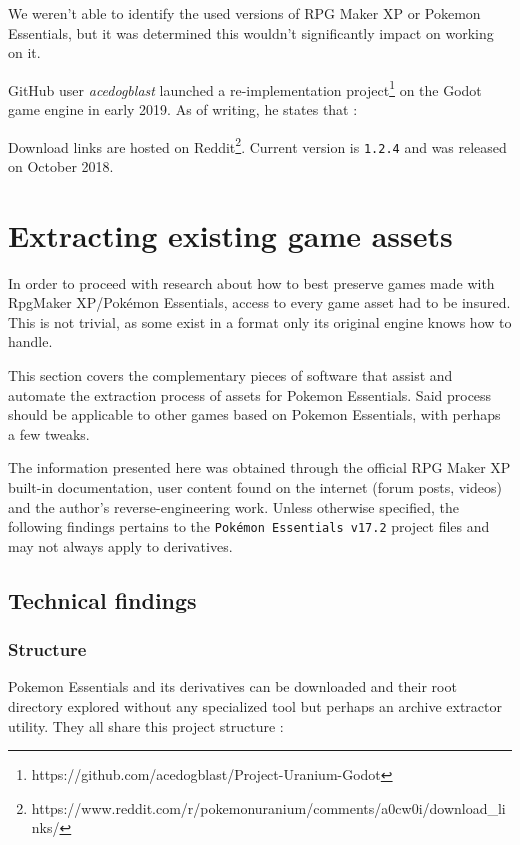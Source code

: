 \documentclass[11pt]{article}
\begin{document}
{We weren't able to identify the used versions of RPG Maker XP or Pokemon Essentials, but it was determined this wouldn't significantly impact on working on it.
	
GitHub user \textit{acedogblast} launched a re-implementation project\footnote{https://github.com/acedogblast/Project-Uranium-Godot} on the Godot game engine in early 2019. As of writing, he states that :
	
Download links are hosted on Reddit\footnote{https://www.reddit.com/r/pokemonuranium/comments/a0cw0i/download\_links/}. Current version is \verb|1.2.4| and was released on October  2018.



\newpage 
\section{Extracting existing game assets}

In order to proceed with research about how to best preserve games made with RpgMaker XP/Pokémon Essentials, access to every game asset had to be insured. This is not trivial, as some exist in a format only its original engine knows how to handle.

This section covers the complementary pieces of software that assist and automate the extraction process of assets for Pokemon Essentials. Said process should be applicable to other games based on Pokemon Essentials, with perhaps a few tweaks.

The information presented here was obtained through the official RPG Maker XP built-in documentation, user content found on the internet (forum posts, videos) and the author's reverse-engineering work. Unless otherwise specified, the following findings pertains to the \texttt{Pokémon Essentials v17.2} project files and may not always apply to derivatives. 


\subsection{Technical findings}

\subsubsection{Structure}

Pokemon Essentials and its derivatives can be downloaded and their root directory explored without any specialized tool but perhaps an archive extractor utility. They all share this project structure :

}
\end{document}
